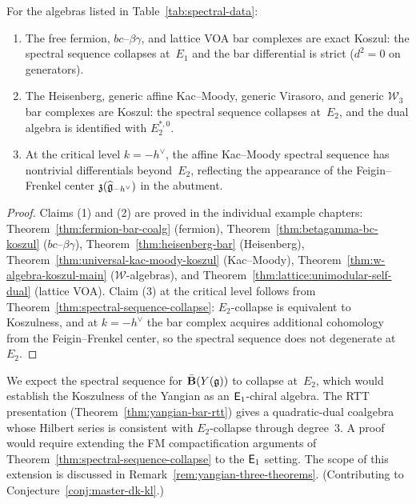 \begin{proposition}
\label{prop:spectral-collapse-summary}
For the algebras listed in Table~\textup{\ref{tab:spectral-data}}:
\begin{enumerate}
\item The free fermion, $bc$--$\beta\gamma$, and lattice VOA
  bar complexes are exact Koszul: the spectral sequence collapses
  at~$E_1$ and the bar differential is strict ($d^2 = 0$ on generators).
\item The Heisenberg, generic affine Kac--Moody, generic Virasoro,
  and generic $\mathcal{W}_3$ bar complexes are Koszul: the spectral
  sequence collapses at~$E_2$, and the dual algebra is identified
  with $E_2^{*,0}$.
\item At the critical level $k = -h^\vee$, the affine Kac--Moody
  spectral sequence has nontrivial differentials beyond~$E_2$,
  reflecting the appearance of the Feigin--Frenkel center
  $\mathfrak{z}(\widehat{\mathfrak{g}}_{-h^\vee})$ in the abutment.
\end{enumerate}
\end{proposition}

\begin{proof}
Claims (1) and (2) are proved in the individual example chapters:
Theorem~\ref{thm:fermion-bar-coalg} (fermion),
Theorem~\ref{thm:betagamma-bc-koszul} ($bc$--$\beta\gamma$),
Theorem~\ref{thm:heisenberg-bar} (Heisenberg),
Theorem~\ref{thm:universal-kac-moody-koszul} (Kac--Moody),
Theorem~\ref{thm:w-algebra-koszul-main} ($\mathcal{W}$-algebras),
and Theorem~\ref{thm:lattice:unimodular-self-dual} (lattice VOA).
Claim (3) at the critical level follows from
Theorem~\ref{thm:spectral-sequence-collapse}:
$E_2$-collapse is equivalent to Koszulness, and at $k = -h^\vee$
the bar complex acquires additional cohomology from the
Feigin--Frenkel center, so the spectral sequence does not degenerate
at~$E_2$.
\end{proof}

\begin{remark}\label{rem:yangian-collapse-conj}
\ClaimStatusConjectured
{}
We expect the spectral sequence for $\bar{\mathbf{B}}(Y(\mathfrak{g}))$ to collapse
at~$E_2$, which would establish the Koszulness of the Yangian as
an $\mathsf{E}_1$-chiral algebra.
The RTT presentation (Theorem~\ref{thm:yangian-bar-rtt}) gives a
quadratic-dual coalgebra whose Hilbert series is consistent with
$E_2$-collapse through degree~$3$.
A proof would require extending the FM compactification arguments
of Theorem~\ref{thm:spectral-sequence-collapse} to the $\mathsf{E}_1$
setting.
The scope of this extension is discussed in
Remark~\ref{rem:yangian-three-theorems}.
(Contributing to Conjecture~\ref{conj:master-dk-kl}.)
\end{remark}

